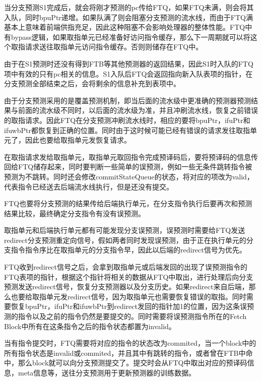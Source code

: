 当分支预测S1完成后，就会将刚才预测的pc传给FTQ，如果FTQ未满，则会将其入队，同时bpuPtr递增。如果队满了则会阻塞分支预测的流水线，而由于FTQ满基本上意味着前端供指充足，因此这种阻塞不会影响处理器的整体性能。FTQ中有bypass逻辑，如果取指单元已经准备好访问指令缓存，那么下一周期就可以将这个取指请求送往取指单元访问指令缓存。否则则储存在FTQ中。

由于在S1预测时还没有得到FTB等其他预测器的返回结果，因此S1时入队的FTQ项中有效的只有pc相关的信息。S1入队后FTQ会返回指向新入队表项的指针，在分支预测全部结束之后，会将剩余的信息补充到表项中。

由于分支预测采用的是覆盖预测机制，即当后面的流水级中更准确的预测器预测结果与前面的流水级不同时，以后面的流水级为准，并且冲刷流水线，恢复之前错误的取指请求。因此FTQ在分支预测冲刷流水线时，相应的要将bpuPtr，ifuPtr和ifuwbPtr都恢复到正确的位置。同时由于这时候可能已经有错误的请求发往取指单元了，因此也要给取指单元发恢复请求。

在取指请求发给取指单元，取指单元取回指令完成预译码后，要将预译码的信息传回给FTQ储存起来，同时要判断一些简单的误预测，例如一些无条件跳转指令被预测为不跳转。同时还会修改commitStateQueue的状态，将对应的项改为valid，代表指令已经送去后端流水线执行，但是还没有提交。

FTQ也要将分支预测的结果传给后端执行单元，在分支指令执行后要再次和预测结果比较，最终确定分支指令有没有误预测。

取指单元和后端执行单元都有可能发现分支误预测，误预测时需要给FTQ发送redirect分支预测重定向信号，假如两者同时发现误预测，由于正在执行单元的分支指令指令序比在取指单元的分支指令早，因此以后端的redirect信号为优先。

FTQ收到redirect信号之后，会拿到取指单元或后端发回的出现了误预测指令的FTQ表项的指针，根据这个指针将相关的数据从FTQ中取出，进行处理后向分支预测发送redirect信号，恢复分支预测器以及分支历史。如果redirect来自后端，那么也要给取指单元发redirect信号，因为取指单元也需要恢复错误的取指。同时需要恢复bpuPtr，ifuPtr和ifuwbPtr到redirect发回的指针加1的位置，因为这条误预测的指令以及之前的指令仍然是要提交的。同时需要将误预测指令所在的Fetch Block中所有在这条指令之后的指令状态都置为invalid。

当有指令提交时，FTQ需要将对应的指令的状态改为commited，当一个block中的所有指令状态是invalid或commited，并且其中有跳转的指令，或者曾在FTB中命中，那么block就可以向分支预测提交了。提交时会从FTQ中取出对应的预译码信息，meta信息等，送往分支预测用于更新预测器的训练数据。


